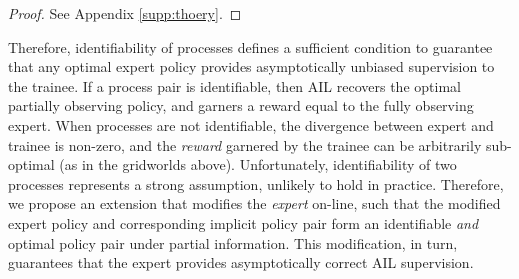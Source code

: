 \begin{proof}
See Appendix \ref{supp:thoery}.
\end{proof}
Therefore, identifiability of processes defines a sufficient condition to guarantee that any optimal expert policy provides asymptotically unbiased supervision to the trainee.  If a process pair is identifiable, then AIL recovers the optimal partially observing policy, and garners a reward equal to the fully observing expert. When processes are not identifiable, the divergence between expert and trainee is non-zero, and the \emph{reward} garnered by the trainee can be arbitrarily sub-optimal (as in the gridworlds above).  Unfortunately, identifiability of two processes represents a strong assumption, unlikely to hold in practice. Therefore, we propose an extension that modifies the \emph{expert} on-line, such that the modified expert policy and corresponding implicit policy pair form an identifiable \emph{and} optimal policy pair under partial information. This modification, in turn, guarantees that the expert provides asymptotically correct AIL supervision.




